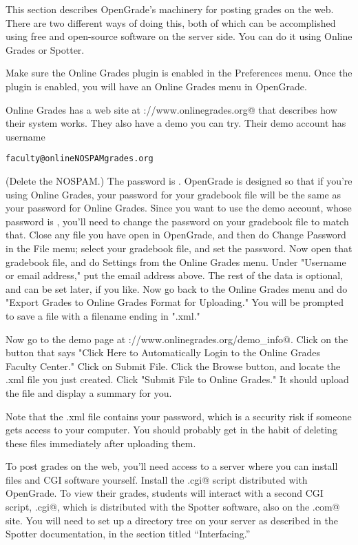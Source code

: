 \documentclass{opengrade_doc}
\begin{document}
\label{web}

This section describes OpenGrade's machinery
for posting grades on the web.
There are two different ways of doing this, both of which can
be accomplished using free and open-source software on the server
side. You can do it using Online Grades or Spotter.


Make sure the Online Grades plugin is enabled in the Preferences menu.
Once the plugin is enabled, you will have an Online Grades menu in OpenGrade.

Online Grades has a web site at \verb@http://www.onlinegrades.org@ that
describes how their system works.
They also have a demo you can try.
Their demo account has username

\verb|faculty@onlineNOSPAMgrades.org|

(Delete the NOSPAM.) The password is \verb@faculty@. OpenGrade is designed so that if you're using Online Grades,
your password for your gradebook file will be the same as your password for Online Grades.
Since you want to use the demo account, whose password is \verb@faculty@, you'll need to change
the password on your gradebook file to match that. Close any file you have open in OpenGrade,
and then do Change Password in the File menu; select your gradebook file, and set the password.
Now open that gradebook file, and do Settings from the Online Grades menu.
Under "Username or email address," put the email address above. The rest of the data is optional,
and can be set later, if you like. Now go back to the Online Grades menu and do
"Export Grades to Online Grades Format for Uploading." You will be prompted to save a file
with a filename ending in ".xml."

Now go to the demo page at \verb@http://www.onlinegrades.org/demo_info@.
Click on the button that says "Click Here to Automatically Login to the Online Grades
Faculty Center." Click on Submit File. Click the Browse button, and locate the
.xml file you just created. Click "Submit File to Online Grades." It should upload the file
and display a summary for you.

Note that the .xml file contains your password, which is a security risk if someone gets access
to your computer. You should probably get in the habit of deleting these files immediately
after uploading them.


To post grades on the web, you'll need access to a server
where you can install files and CGI software yourself.
Install the \verb@ServerOG.cgi@ script
distributed with OpenGrade. To view their grades, students
will interact with a second CGI script, \verb@Spotter.cgi@, which
is distributed with the Spotter software, also on the
\verb@lightandmatter.com@ site. You will need to set up
a directory tree on your server as described in the Spotter
documentation, in the section titled ``Interfacing.''
\end{document}
